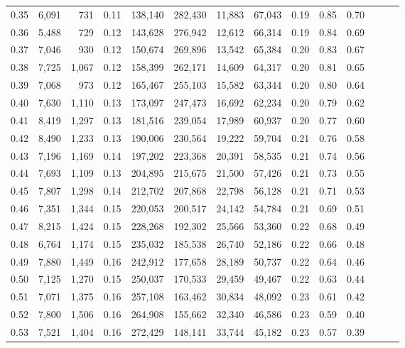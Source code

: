 \begin{tabular}{rrrrrrrrrrrrrr}
0.35 &  6,091 &    731 &  0.11 &  138,140 &  282,430 &  11,883 &  67,043 &  0.19 &  0.85 &      0.70 \\
0.36 &  5,488 &    729 &  0.12 &  143,628 &  276,942 &  12,612 &  66,314 &  0.19 &  0.84 &      0.69 \\
0.37 &  7,046 &    930 &  0.12 &  150,674 &  269,896 &  13,542 &  65,384 &  0.20 &  0.83 &      0.67 \\
0.38 &  7,725 &  1,067 &  0.12 &  158,399 &  262,171 &  14,609 &  64,317 &  0.20 &  0.81 &      0.65 \\
0.39 &  7,068 &    973 &  0.12 &  165,467 &  255,103 &  15,582 &  63,344 &  0.20 &  0.80 &      0.64 \\
0.40 &  7,630 &  1,110 &  0.13 &  173,097 &  247,473 &  16,692 &  62,234 &  0.20 &  0.79 &      0.62 \\
0.41 &  8,419 &  1,297 &  0.13 &  181,516 &  239,054 &  17,989 &  60,937 &  0.20 &  0.77 &      0.60 \\
0.42 &  8,490 &  1,233 &  0.13 &  190,006 &  230,564 &  19,222 &  59,704 &  0.21 &  0.76 &      0.58 \\
0.43 &  7,196 &  1,169 &  0.14 &  197,202 &  223,368 &  20,391 &  58,535 &  0.21 &  0.74 &      0.56 \\
0.44 &  7,693 &  1,109 &  0.13 &  204,895 &  215,675 &  21,500 &  57,426 &  0.21 &  0.73 &      0.55 \\
0.45 &  7,807 &  1,298 &  0.14 &  212,702 &  207,868 &  22,798 &  56,128 &  0.21 &  0.71 &      0.53 \\
0.46 &  7,351 &  1,344 &  0.15 &  220,053 &  200,517 &  24,142 &  54,784 &  0.21 &  0.69 &      0.51 \\
0.47 &  8,215 &  1,424 &  0.15 &  228,268 &  192,302 &  25,566 &  53,360 &  0.22 &  0.68 &      0.49 \\
0.48 &  6,764 &  1,174 &  0.15 &  235,032 &  185,538 &  26,740 &  52,186 &  0.22 &  0.66 &      0.48 \\
0.49 &  7,880 &  1,449 &  0.16 &  242,912 &  177,658 &  28,189 &  50,737 &  0.22 &  0.64 &      0.46 \\
0.50 &  7,125 &  1,270 &  0.15 &  250,037 &  170,533 &  29,459 &  49,467 &  0.22 &  0.63 &      0.44 \\
0.51 &  7,071 &  1,375 &  0.16 &  257,108 &  163,462 &  30,834 &  48,092 &  0.23 &  0.61 &      0.42 \\
0.52 &  7,800 &  1,506 &  0.16 &  264,908 &  155,662 &  32,340 &  46,586 &  0.23 &  0.59 &      0.40 \\
0.53 &  7,521 &  1,404 &  0.16 &  272,429 &  148,141 &  33,744 &  45,182 &  0.23 &  0.57 &      0.39 \\

\end{tabular}
